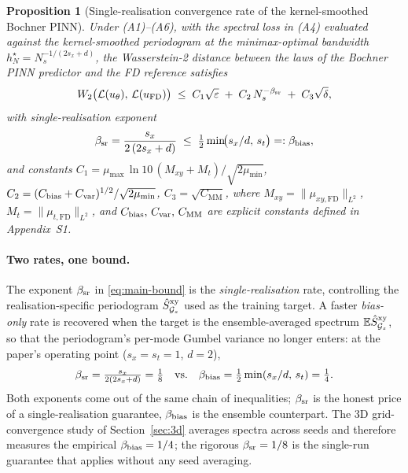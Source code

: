 \documentclass[review,12pt]{elsarticle}
\newtheorem{proposition}{Proposition}
\begin{document}
\begin{proposition}[Single-realisation convergence rate of the
kernel-smoothed Bochner PINN]
\label{thm:main}
Under (A1)--(A6), with the spectral loss in (A4) evaluated against
the kernel-smoothed periodogram at the minimax-optimal bandwidth
$h_N^\star = N_s^{-1/(2s_x+d)}$, the Wasserstein-2 distance between
the laws of the Bochner PINN predictor and the FD reference satisfies
\begin{equation}
W_2\bigl(\mathcal L(u_\theta),\,\mathcal L(u_{\mathrm{FD}})\bigr)
\;\le\; C_1\sqrt{\varepsilon}
\;+\; C_2\,N_s^{-\beta_{\rm sr}}
\;+\; C_3\sqrt{\delta},
\label{eq:main-bound}
\end{equation}
with single-realisation exponent
\begin{equation}
\beta_{\rm sr} = \frac{s_x}{2\,(2 s_x + d)}
\;\le\;
\tfrac{1}{2}\min\!\bigl(s_x/d,\,s_t\bigr) =: \beta_{\rm bias},
\end{equation}
and constants
\(C_1 = \mu_{\max}\,\ln 10\,(M_{xy}+M_t) / \sqrt{2\mu_{\min}}\),
\(C_2 = (C_{\rm bias}+C_{\rm var})^{1/2}/\sqrt{2\mu_{\min}}\),
\(C_3 = \sqrt{C_{\mathrm{MM}}}\), where
\(M_{xy} = \|\mu_{xy,\mathrm{FD}}\|_{L^2}\),
\(M_t = \|\mu_{t,\mathrm{FD}}\|_{L^2}\), and
\(C_{\rm bias},\,C_{\rm var},\,C_{\mathrm{MM}}\) are explicit constants
defined in Appendix~S1.
\end{proposition}

\paragraph{Two rates, one bound.}
\label{para:two-rates}
The exponent \(\beta_{\rm sr}\) in \eqref{eq:main-bound} is the
\emph{single-realisation} rate, controlling the realisation-specific
periodogram \(\hat S^{\rm xy}_{\mathcal G_s}\) used as the training
target. A faster \emph{bias-only} rate is recovered when the target
is the ensemble-averaged spectrum
\(\mathbb E\hat S^{\rm xy}_{\mathcal G_s}\), so that the
periodogram's per-mode Gumbel variance no longer enters: at the
paper's operating point (\(s_x = s_t = 1\), \(d = 2\)),
\[
\beta_{\rm sr} = \tfrac{s_x}{2(2s_x+d)} = \tfrac18
\quad\text{vs.}\quad
\beta_{\rm bias} = \tfrac12\min(s_x/d,\,s_t) = \tfrac14.
\]
Both exponents come out of the same chain of inequalities;
\(\beta_{\rm sr}\) is the honest price of a single-realisation
guarantee, \(\beta_{\rm bias}\) is the ensemble counterpart.
The 3D grid-convergence study of Section~\ref{sec:3d} averages
spectra across seeds and therefore measures the empirical
\(\beta_{\rm bias} = 1/4\); the rigorous \(\beta_{\rm sr} = 1/8\) is
the single-run guarantee that applies without any seed averaging.
\end{document}
